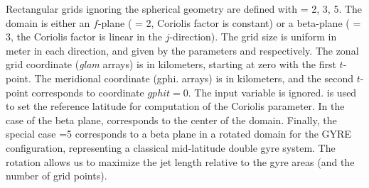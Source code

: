 Rectangular grids ignoring the spherical geometry are defined with 
 = 2, 3, 5. The domain is either an $f$-plane ( = 2, 
Coriolis factor is constant) or a beta-plane ( = 3, the Coriolis factor 
is linear in the $j$-direction). The grid size is uniform in meter in each direction, 
and given by the parameters  and  respectively. 
The zonal grid coordinate (\textit{glam} arrays) is in kilometers, starting at zero 
with the first $t$-point. The meridional coordinate (gphi. arrays) is in kilometers, 
and the second $t$-point corresponds to coordinate $gphit=0$. The input 
variable  is ignored.  is used to set the reference 
latitude for computation of the Coriolis parameter. In the case of the beta plane, 
 corresponds to the center of the domain. Finally, the special case 
=5 corresponds to a beta plane in a rotated domain for the 
GYRE configuration, representing a classical mid-latitude double gyre system. 
The rotation allows us to maximize the jet length relative to the gyre areas 
(and the number of grid points). 

